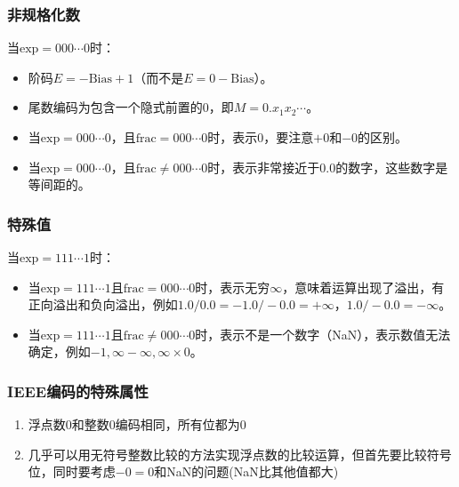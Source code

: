 \subsubsection{非规格化数}
当\(\text{exp}=000\cdots0\)时：
\begin{itemize}
    \item 阶码\(E=-\text{Bias}+1\)（而不是\(E = 0-\text{Bias}\)）。
    \item 尾数编码为包含一个隐式前置的0，即\(M = 0.x_1x_2\cdots\)。
    \item 当\(\text{exp}=000\cdots0\)，且\(\text{frac}=000\cdots0\)时，表示0，要注意\(+0\)和\(-0\)的区别。
    \item 当\(\text{exp}=000\cdots0\)，且\(\text{frac}\neq000\cdots0\)时，表示非常接近于0.0的数字，这些数字是等间距的。
\end{itemize}

\subsubsection{特殊值}
当\(\text{exp}=111\cdots1\)时：
\begin{itemize}
    \item 当\(\text{exp}=111\cdots1\)且\(\text{frac}=000\cdots0\)时，表示无穷\(\infty\)，意味着运算出现了溢出，有正向溢出和负向溢出，例如\(1.0/0.0=-1.0/-0.0=+\infty\)，\(1.0/-0.0=-\infty\)。
    \item 当\(\text{exp}=111\cdots1\)且\(\text{frac}\neq000\cdots0\)时，表示不是一个数字（NaN），表示数值无法确定，例如\(-1,\infty-\infty,\infty\times0\)。
\end{itemize}

\subsubsection{IEEE编码的特殊属性}
\begin{enumerate}
    \item 浮点数0和整数0编码相同，所有位都为0
    \item 几乎可以用无符号整数比较的方法实现浮点数的比较运算，但首先要比较符号位，同时要考虑\(-0 = 0\)和NaN的问题(NaN比其他值都大)
\end{enumerate}

